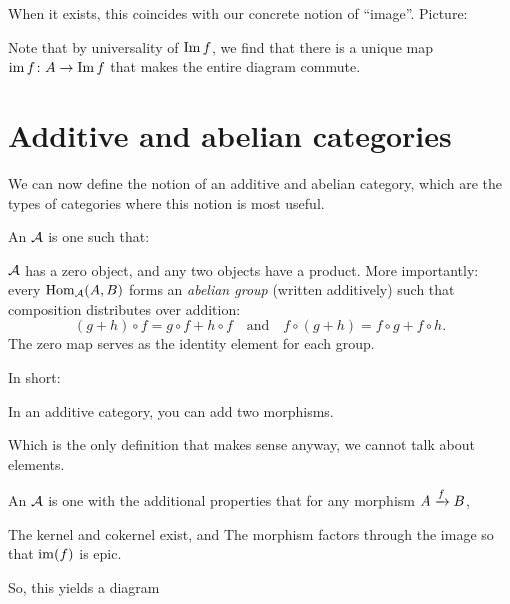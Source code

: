 When it exists, this coincides with our concrete notion of ``image''.
Picture:
\begin{center}
\end{center}
Note that by universality of $\Img f$,
we find that there is a unique map
$\img f \colon A \to \Img f$ that makes the entire diagram commute.

\section{Additive and abelian categories}
We can now define the notion of an additive and abelian category,
which are the types of categories where this notion is most useful.

\begin{definition}
	An  $\AA$ is one such that:
	\begin{itemize}
		\ii $\AA$ has a zero object, and any two objects have a product.
		\ii More importantly: every $\Hom_\AA(A, B)$ forms an \emph{abelian group} (written additively)
		such that composition distributes over addition:
		\[ (g+h)\circ f = g\circ f + h\circ f
			\quad\text{and}\quad
			f\circ(g+h) = f\circ g + f \circ h. \]
		The zero map serves as the identity element for each group.
\end{itemize}
\end{definition}
In short:
\begin{moral}
	In an additive category, you can add two morphisms.
\end{moral}
Which is the only definition that makes sense anyway, we cannot talk about elements.

\begin{definition}
	An  $\AA$ is one with the additional properties that
	for any morphism $A \taking f B$,
	\begin{itemize}
		\ii The kernel and cokernel exist, and
		\ii The morphism factors through the image so that $\img(f)$ is epic.
	\end{itemize}
	So, this yields a diagram
	\begin{center}
	\end{center}
\end{definition}

